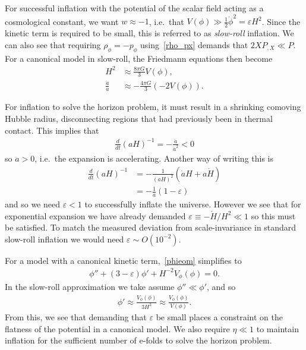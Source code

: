     For successful inflation with the potential of the scalar field acting as a
    cosmological constant, we want $w\approx-1$,
    i.e.\ that $V(\phi)\gg\frac{1}{2}\dot{\phi}^2=\varepsilon H^2$. Since the kinetic term is required to
    be small, this is referred to as \textit{slow-roll} inflation.
We can also see that requiring $\rho_\phi=-p_\phi$ using~\eqref{rho_px} demands that
$2XP_{,X}\ll P$.
    For a canonical model in slow-roll,
    the Friedmann equations then become
    \begin{align}
        H^2 &\approx \frac{8\pi G}{3}V(\phi),\\
        \frac{\ddot{a}}{a} &\approx -\frac{4\pi G}{3}\left(-2V(\phi)\right).
    \end{align}

    For inflation to solve the horizon problem, it must result in a shrinking comoving
    Hubble radius, disconnecting regions that had previously been in thermal contact.
    This implies that
    \begin{align}
        \frac{d}{dt}\left(aH\right)^{-1} = -\frac{\ddot{a}}{\dot{a}^2} < 0
    \end{align}
    so $\ddot{a}>0$, i.e.\ the expansion is accelerating. Another way of writing this is
    \begin{align}
        \frac{d}{dt}\left(aH\right)^{-1} &= -\frac{1}{(aH)^2}\left(\dot{a}H+a\dot{H}\right)\\
            &= -\frac{1}{a}\left(1-\varepsilon\right)
    \end{align}
    and so we need $\varepsilon<1$ to successfully inflate the universe.
    However we see that for exponential expansion we have already demanded
    $\varepsilon\equiv-\dot{H}/H^2\ll1$ so this must be satisfied.
    To match the measured deviation from scale-invariance in standard slow-roll
    inflation we would need $\varepsilon\sim O(10^{-2})$.


For a model with a canonical kinetic term,~\eqref{phieom} simplifies
to
\begin{align}
    \phi''+(3-\varepsilon)\phi'+H^{-2}V_{\phi}(\phi)=0.
\end{align}
In the slow-roll approximation we take assume $\phi''\ll\phi'$,
and so
\begin{align}
    \phi'\approx\frac{V_{\phi}(\phi)}{3H^2}\approx\frac{V_{\phi}(\phi)}{V(\phi)}.
\end{align}
From this, we see that demanding that $\varepsilon$ be small places a constraint
on the flatness of the potential in a canonical model.
We also require $\eta\ll1$ to maintain inflation for the sufficient number
of e-folds to solve the horizon problem.


